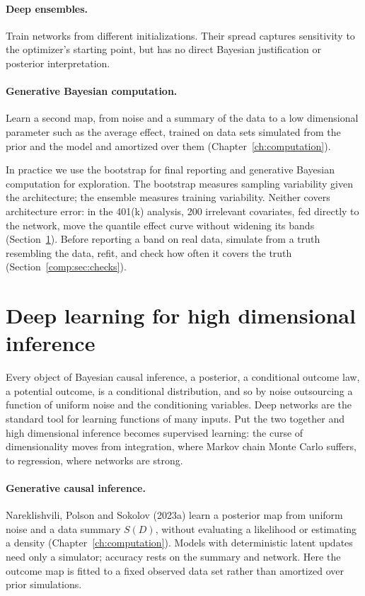 \paragraph{Deep ensembles.} Train networks from different initializations. Their spread captures sensitivity to the optimizer's starting point, but has no direct Bayesian justification or posterior interpretation.

\paragraph{Generative Bayesian computation.} Learn a second map, from noise and a summary of the data to a low dimensional parameter such as the average effect, trained on data sets simulated from the prior and the model and amortized over them (Chapter~\ref{ch:computation}).

In practice we use the bootstrap for final reporting and generative Bayesian computation for exploration. The bootstrap measures sampling variability given the architecture; the ensemble measures training variability. Neither covers architecture error: in the 401(k) analysis, 200 irrelevant covariates, fed directly to the network, move the quantile effect curve without widening its bands (Section~\ref{sec:deephd}). Before reporting a band on real data, simulate from a truth resembling the data, refit, and check how often it covers the truth (Section~\ref{comp:sec:checks}).

\section{Deep learning for high dimensional inference}\label{sec:deephd}

Every object of Bayesian causal inference, a posterior, a conditional outcome law, a potential outcome, is a conditional distribution, and so by noise outsourcing a function of uniform noise and the conditioning variables. Deep networks are the standard tool for learning functions of many inputs. Put the two together and high dimensional inference becomes supervised learning: the curse of dimensionality moves from integration, where Markov chain Monte Carlo suffers, to regression, where networks are strong.

\paragraph{Generative causal inference.} Nareklishvili, Polson and Sokolov (2023a) learn a posterior map from uniform noise and a data summary $S(D)$, without evaluating a likelihood or estimating a density (Chapter~\ref{ch:computation}). Models with deterministic latent updates need only a simulator; accuracy rests on the summary and network. Here the outcome map is fitted to a fixed observed data set rather than amortized over prior simulations.

